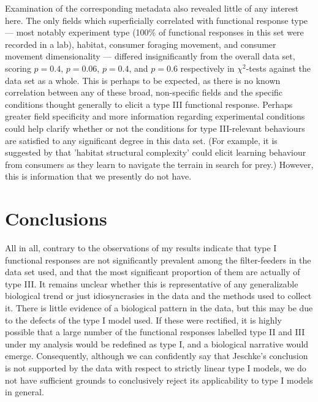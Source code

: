 \documentclass[11pt]{article}
\begin{document}
    Examination of the corresponding metadata also revealed little of any interest here. The only fields which superficially correlated with functional response type — most notably experiment type (100\% of functional responses in this set were recorded in a lab), habitat, consumer foraging movement, and consumer movement dimensionality — differed insignificantly from the overall data set, scoring $p=0.4$, $p=0.06$, $p=0.4$, and $p=0.6$ respectively in $\chi^2$-tests against the data set as a whole. This is perhaps to be expected, as there is no known correlation between any of these broad, non-specific fields and the specific conditions thought generally to elicit a type III functional response. Perhaps greater field specificity and more information regarding experimental conditions could help clarify whether or not the conditions for type III-relevant behaviours are satisfied to any significant degree in this data set. (For example, it is suggested by \citet{pawar2012dimensionality} that 'habitat structural complexity' could elicit learning behaviour from consumers as they learn to navigate the terrain in search for prey.) However, this is information that we presently do not have.
    
    \section{Conclusions}
    
    All in all, contrary to the observations of \citet{jeschke2004consumer} my results indicate that type I functional responses are not significantly prevalent among the filter-feeders in the data set used, and that the most significant proportion of them are actually of type III. It remains unclear whether this is representative of any generalizable biological trend or just idiosyncrasies in the data and the methods used to collect it. There is little evidence of a biological pattern in the data, but this may be due to the defects of the type I model used. If these were rectified, it is highly possible that a large number of the functional responses labelled type II and III under my analysis would be redefined as type I, and a biological narrative would emerge. Consequently, although we can confidently say that Jeschke's conclusion is not supported by the data with respect to strictly linear type I models, we do not have sufficient grounds to conclusively reject its applicability to type I models in general.

    \newpage
    
    
\end{document}
